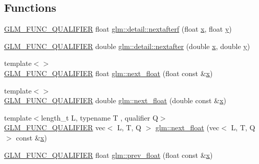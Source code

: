 \subsection*{Functions}
\begin{DoxyCompactItemize}
\item 
\mbox{\hyperlink{setup_8hpp_a33fdea6f91c5f834105f7415e2a64407}{G\+L\+M\+\_\+\+F\+U\+N\+C\+\_\+\+Q\+U\+A\+L\+I\+F\+I\+ER}} float \mbox{\hyperlink{namespaceglm_1_1detail_ab0eb795c482130b1d6c83470bdb031e6}{glm\+::detail\+::nextafterf}} (float \mbox{\hyperlink{_s_d_l__opengl_8h_ad0e63d0edcdbd3d79554076bf309fd47}{x}}, float \mbox{\hyperlink{_s_d_l__opengl_8h_a1675d9d7bb68e1657ff028643b4037e3}{y}})
\item 
\mbox{\hyperlink{setup_8hpp_a33fdea6f91c5f834105f7415e2a64407}{G\+L\+M\+\_\+\+F\+U\+N\+C\+\_\+\+Q\+U\+A\+L\+I\+F\+I\+ER}} double \mbox{\hyperlink{namespaceglm_1_1detail_a3c14f8400407e8b4cff5be12ceef2c1e}{glm\+::detail\+::nextafter}} (double \mbox{\hyperlink{_s_d_l__opengl_8h_ad0e63d0edcdbd3d79554076bf309fd47}{x}}, double \mbox{\hyperlink{_s_d_l__opengl_8h_a1675d9d7bb68e1657ff028643b4037e3}{y}})
\item 
{\footnotesize template$<$$>$ }\\\mbox{\hyperlink{setup_8hpp_a33fdea6f91c5f834105f7415e2a64407}{G\+L\+M\+\_\+\+F\+U\+N\+C\+\_\+\+Q\+U\+A\+L\+I\+F\+I\+ER}} float \mbox{\hyperlink{namespaceglm_a094d145a4ae8efb9e42e88883cfb15f1}{glm\+::next\+\_\+float}} (float const \&\mbox{\hyperlink{_s_d_l__opengl_8h_ad0e63d0edcdbd3d79554076bf309fd47}{x}})
\item 
{\footnotesize template$<$$>$ }\\\mbox{\hyperlink{setup_8hpp_a33fdea6f91c5f834105f7415e2a64407}{G\+L\+M\+\_\+\+F\+U\+N\+C\+\_\+\+Q\+U\+A\+L\+I\+F\+I\+ER}} double \mbox{\hyperlink{namespaceglm_a451149113e1a5083fcba0546de81ad51}{glm\+::next\+\_\+float}} (double const \&\mbox{\hyperlink{_s_d_l__opengl_8h_ad0e63d0edcdbd3d79554076bf309fd47}{x}})
\item 
{\footnotesize template$<$length\+\_\+t L, typename T , qualifier Q$>$ }\\\mbox{\hyperlink{setup_8hpp_a33fdea6f91c5f834105f7415e2a64407}{G\+L\+M\+\_\+\+F\+U\+N\+C\+\_\+\+Q\+U\+A\+L\+I\+F\+I\+ER}} vec$<$ L, T, Q $>$ \mbox{\hyperlink{namespaceglm_a7aa4738ac943cea90328c262537c6914}{glm\+::next\+\_\+float}} (vec$<$ L, T, Q $>$ const \&\mbox{\hyperlink{_s_d_l__opengl_8h_ad0e63d0edcdbd3d79554076bf309fd47}{x}})
\item 
\mbox{\hyperlink{setup_8hpp_a33fdea6f91c5f834105f7415e2a64407}{G\+L\+M\+\_\+\+F\+U\+N\+C\+\_\+\+Q\+U\+A\+L\+I\+F\+I\+ER}} float \mbox{\hyperlink{namespaceglm_a1fd407652d7ccfbe810674a2e5cbc8eb}{glm\+::prev\+\_\+float}} (float const \&\mbox{\hyperlink{_s_d_l__opengl_8h_ad0e63d0edcdbd3d79554076bf309fd47}{x}})

\end{DoxyCompactItemize}
